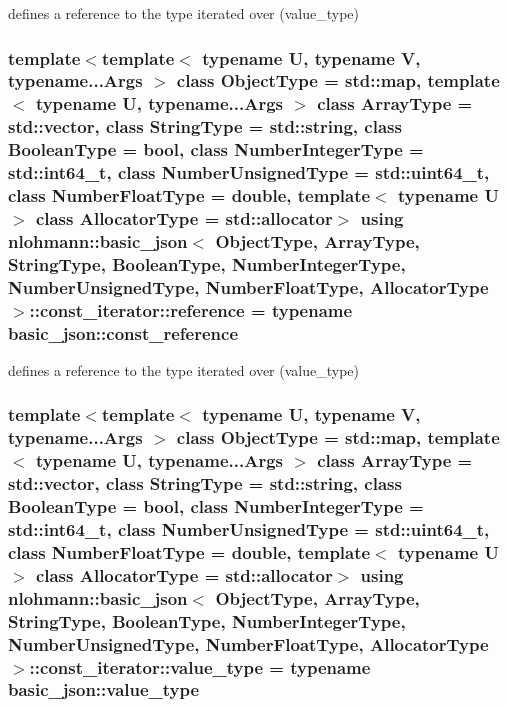 defines a reference to the type iterated over (value\-\_\-type) 

\hypertarget{classnlohmann_1_1basic__json_1_1const__iterator_aefd248cac6493eed1e6ff53ba6a63eb2}{
\subsubsection[{reference}]{\setlength{\rightskip}{0pt plus 5cm}template$<$template$<$ typename U, typename V, typename...\-Args $>$ class Object\-Type = std\-::map, template$<$ typename U, typename...\-Args $>$ class Array\-Type = std\-::vector, class String\-Type  = std\-::string, class Boolean\-Type  = bool, class Number\-Integer\-Type  = std\-::int64\-\_\-t, class Number\-Unsigned\-Type  = std\-::uint64\-\_\-t, class Number\-Float\-Type  = double, template$<$ typename U $>$ class Allocator\-Type = std\-::allocator$>$ using {\bf nlohmann\-::basic\-\_\-json}$<$ Object\-Type, Array\-Type, String\-Type, Boolean\-Type, Number\-Integer\-Type, Number\-Unsigned\-Type, Number\-Float\-Type, Allocator\-Type $>$\-::{\bf const\-\_\-iterator\-::reference} =  typename {\bf basic\-\_\-json\-::const\-\_\-reference}}}\label{classnlohmann_1_1basic__json_1_1const__iterator_aefd248cac6493eed1e6ff53ba6a63eb2}


defines a reference to the type iterated over (value\-\_\-type) 

\hypertarget{classnlohmann_1_1basic__json_1_1const__iterator_a9ea0497199b1e96ce9cadd1f202ec343}{
\subsubsection[{value\-\_\-type}]{\setlength{\rightskip}{0pt plus 5cm}template$<$template$<$ typename U, typename V, typename...\-Args $>$ class Object\-Type = std\-::map, template$<$ typename U, typename...\-Args $>$ class Array\-Type = std\-::vector, class String\-Type  = std\-::string, class Boolean\-Type  = bool, class Number\-Integer\-Type  = std\-::int64\-\_\-t, class Number\-Unsigned\-Type  = std\-::uint64\-\_\-t, class Number\-Float\-Type  = double, template$<$ typename U $>$ class Allocator\-Type = std\-::allocator$>$ using {\bf nlohmann\-::basic\-\_\-json}$<$ Object\-Type, Array\-Type, String\-Type, Boolean\-Type, Number\-Integer\-Type, Number\-Unsigned\-Type, Number\-Float\-Type, Allocator\-Type $>$\-::{\bf const\-\_\-iterator\-::value\-\_\-type} =  typename {\bf basic\-\_\-json\-::value\-\_\-type}}}\label{classnlohmann_1_1basic__json_1_1const__iterator_a9ea0497199b1e96ce9cadd1f202ec343}


